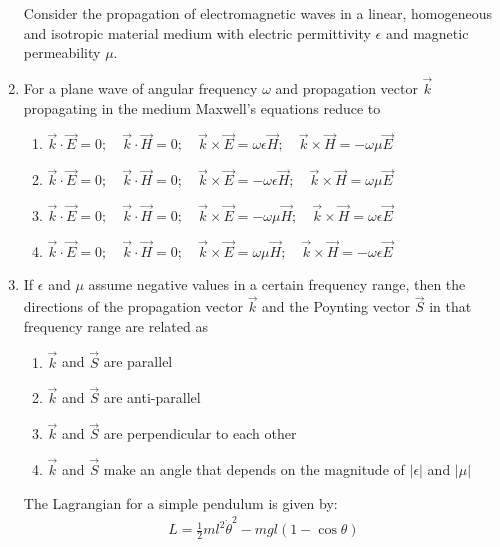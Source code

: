 \documentclass[journal,12pt,onecolumn]{IEEEtran}
\theoremstyle{remark}
\begin{document}
\begin{enumerate}
\par\noindent Consider the propagation of electromagnetic waves in a linear, homogeneous and isotropic material medium with electric permittivity $\epsilon$ and magnetic permeability $\mu$.

\item For a plane wave of angular frequency $\omega$ and propagation vector $\vec{k}$ propagating in the medium Maxwell's equations reduce to\hfill{}

\begin{enumerate}
	\item $\vec{k} \cdot \vec{E} = 0; \quad \vec{k} \cdot \vec{H} = 0; \quad \vec{k} \times \vec{E} = \omega\epsilon\vec{H}; \quad \vec{k} \times \vec{H} = -\omega\mu\vec{E}$
	\item $\vec{k} \cdot \vec{E} = 0; \quad \vec{k} \cdot \vec{H} = 0; \quad \vec{k} \times \vec{E} = -\omega\epsilon\vec{H}; \quad \vec{k} \times \vec{H} = \omega\mu\vec{E}$
	\item $\vec{k} \cdot \vec{E} = 0; \quad \vec{k} \cdot \vec{H} = 0; \quad \vec{k} \times \vec{E} = -\omega\mu\vec{H}; \quad \vec{k} \times \vec{H} = \omega\epsilon\vec{E}$
	\item $\vec{k} \cdot \vec{E} = 0; \quad \vec{k} \cdot \vec{H} = 0; \quad \vec{k} \times \vec{E} = \omega\mu\vec{H}; \quad \vec{k} \times \vec{H} = -\omega\epsilon\vec{E}$
\end{enumerate}

\item If $\epsilon$ and $\mu$ assume negative values in a certain frequency range, then the directions of the propagation vector $\vec{k}$ and the Poynting vector $\vec{S}$ in that frequency range are related as\hfill{}

\begin{enumerate}
	\item $\vec{k}$ and $\vec{S}$ are parallel \item $\vec{k}$ and $\vec{S}$ are anti-parallel
	\item $\vec{k}$ and $\vec{S}$ are perpendicular to each other
	\item $\vec{k}$ and $\vec{S}$ make an angle that depends on the magnitude of $|\epsilon|$ and $|\mu|$
\end{enumerate}

\par\noindent The Lagrangian for a simple pendulum is given by:
\begin{align*} L = \frac{1}{2}ml^2\dot{\theta}^2 - mgl(1-\cos\theta) \end{align*}


\end{enumerate}
\end{document}
